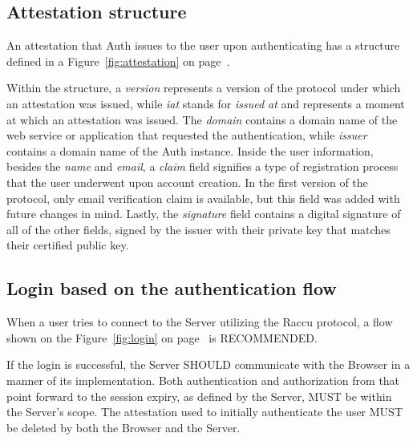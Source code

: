     \subsection{Attestation structure}
    An attestation that Auth issues to the user upon authenticating has a structure defined in a Figure~\ref{fig:attestation}
    on page~\pageref{fig:attestation}.
    
    Within the structure, a \textit{version} represents a version of the protocol under which an attestation was issued, 
    while \textit{iat} stands for \textit{issued at} and represents a moment at which an attestation was issued. The 
    \textit{domain} contains a domain name of the web service or application that requested the authentication, while 
    \textit{issuer} contains a domain name of the Auth instance. Inside the user information, besides the \textit{name}
    and \textit{email}, a \textit{claim} field signifies a type of registration process that the user underwent upon 
    account creation. In the first version of the protocol, only email verification claim is available, but this field 
    was added with future changes in mind. Lastly, the \textit{signature} field contains a digital signature of all of 
    the other fields, signed by the issuer with their private key that matches their certified public key. 

    \subsection{Login based on the authentication flow}
    When a user tries to connect to the Server utilizing the Raccu protocol, a flow shown on the Figure~\ref{fig:login} 
    on page~\pageref{fig:login} is RECOMMENDED.
    
    If the login is successful, the Server SHOULD communicate with the Browser in a manner of its implementation. Both 
    authentication and authorization from that point forward to the session expiry, as defined by the Server, MUST be 
    within the Server's scope. The attestation used to initially authenticate the user MUST be deleted by both the Browser
    and the Server.       
